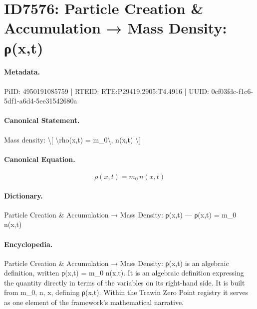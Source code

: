 \section*{ID7576: Particle Creation \& Accumulation → Mass Density: ρ(x,t)}
\paragraph{Metadata.}
PiID: 4950191085759 | RTEID: RTE:P29419.2905:T4.4916 | UUID: 0cf03fdc-f1c6-5df1-a6d4-5ee31542680a

\paragraph{Canonical Statement.}
Mass density: \textbackslash{}[ \textbackslash{}rho(x,t) = m\_0\textbackslash{}, n(x,t) \textbackslash{}]

\paragraph{Canonical Equation.}
\[
\rho(x,t) = m_0\, n(x,t)
\]

\paragraph{Dictionary.}
Particle Creation \& Accumulation → Mass Density: ρ(x,t) — ρ(x,t) = m\_0 n(x,t)

\paragraph{Encyclopedia.}
Particle Creation \& Accumulation → Mass Density: ρ(x,t) is an algebraic definition, written ρ(x,t) = m\_0 n(x,t). It is an algebraic definition expressing the quantity directly in terms of the variables on its right-hand side. It is built from m\_0, n, x, defining ρ(x,t). Within the Trawin Zero Point registry it serves as one element of the framework's mathematical narrative.

